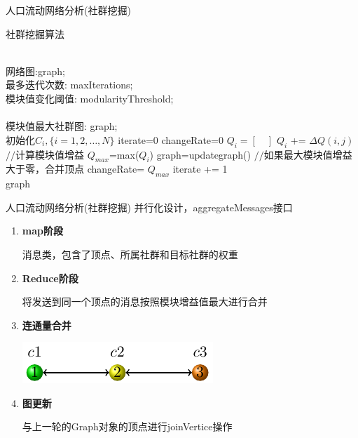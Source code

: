 \begin{frame}[t]{人口流动网络分析(社群挖掘)}

    \begin{algorithm}[H]
    \tiny
\caption{社群挖掘算法}
\begin{algorithmic}[1]
\REQUIRE ~~\\
网络图:graph; \\
最多迭代次数: maxIterations;\\
模块值变化阈值: modularityThreshold;\\
\ENSURE ~~\\
模块值最大社群图: graph; \\
\STATE 初始化$C_i,\{i=1, 2,\ldots , N\}$
\STATE iterate=0
    \STATE changeRate=0
    \STATE $Q_i=[\quad ]$
    	\STATE $Q_i$ += $\Delta Q(i,j)$ $//$计算模块值增益
    \ENDFOR
    \STATE $Q_{max}$=max($Q_i$)
    	\STATE graph=updategraph() $//$如果最大模块值增益大于零，合并顶点
	\STATE changeRate= $Q_{max}$
    \ENDIF
    \ENDFOR
 \STATE iterate += 1 \\
\ENDWHILE
\RETURN graph
\end{algorithmic}
\end{algorithm}
\end{frame}

\begin{frame}[t]{人口流动网络分析(社群挖掘)}
    并行化设计，aggregateMessages接口
    \begin{enumerate}

    \pause 
    \item \textbf{map阶段}

    消息类，包含了顶点、所属社群和目标社群的权重

    \pause
    \item \textbf{Reduce阶段}

    将发送到同一个顶点的消息按照模块增益值最大进行合并

    \pause
    \item \textbf{连通量合并}

    \includegraphics[scale=0.8]{figures/communitycombine.pdf}

    \pause
    \item \textbf{图更新}
    
    与上一轮的Graph对象的顶点进行joinVertice操作

    \end{enumerate}

\end{frame}

